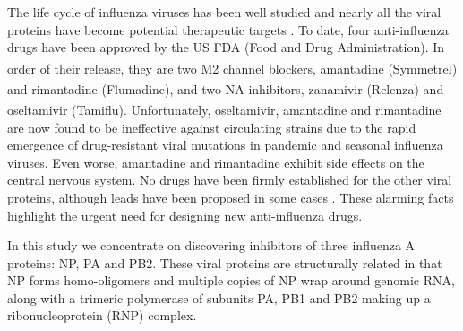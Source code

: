 The life cycle of influenza viruses has been well studied \citep{1539,1522,1525} and nearly all the viral proteins have become potential therapeutic targets \citep{1539,1519,1229,1523,1525}. To date, four anti-influenza drugs have been approved by the US FDA (Food and Drug Administration). In order of their release, they are two M2 channel blockers, amantadine (Symmetrel\textsuperscript{\textregistered}) and rimantadine (Flumadine\textsuperscript{\textregistered}), and two NA inhibitors, zanamivir (Relenza\textsuperscript{\textregistered}) and oseltamivir (Tamiflu\textsuperscript{\textregistered}). Unfortunately, oseltamivir, amantadine and rimantadine are now found to be ineffective against circulating strains due to the rapid emergence of drug-resistant viral mutations in pandemic and seasonal influenza viruses. Even worse, amantadine and rimantadine exhibit side effects on the central nervous system. No drugs have been firmly established for the other viral proteins, although leads have been proposed in some cases \citep{1229,1522,1523,1525}. These alarming facts highlight the urgent need for designing new anti-influenza drugs.


In this study we concentrate on discovering inhibitors of three influenza A proteins: NP, PA and PB2. These viral proteins are structurally related in that NP forms homo-oligomers and multiple copies of NP wrap around genomic RNA, along with a trimeric polymerase of subunits PA, PB1 and PB2 making up a ribonucleoprotein (RNP) complex.

